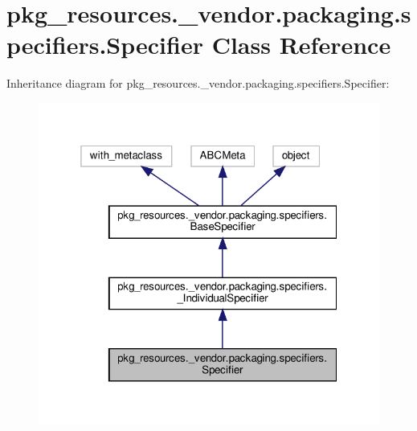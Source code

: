 \hypertarget{classpkg__resources_1_1__vendor_1_1packaging_1_1specifiers_1_1Specifier}{}\section{pkg\+\_\+resources.\+\_\+vendor.\+packaging.\+specifiers.\+Specifier Class Reference}
\label{classpkg__resources_1_1__vendor_1_1packaging_1_1specifiers_1_1Specifier}


Inheritance diagram for pkg\+\_\+resources.\+\_\+vendor.\+packaging.\+specifiers.\+Specifier\+:
\nopagebreak
\begin{figure}[H]
\begin{center}
\leavevmode
\includegraphics[width=319pt]{classpkg__resources_1_1__vendor_1_1packaging_1_1specifiers_1_1Specifier__inherit__graph}
\end{center}
\end{figure}



